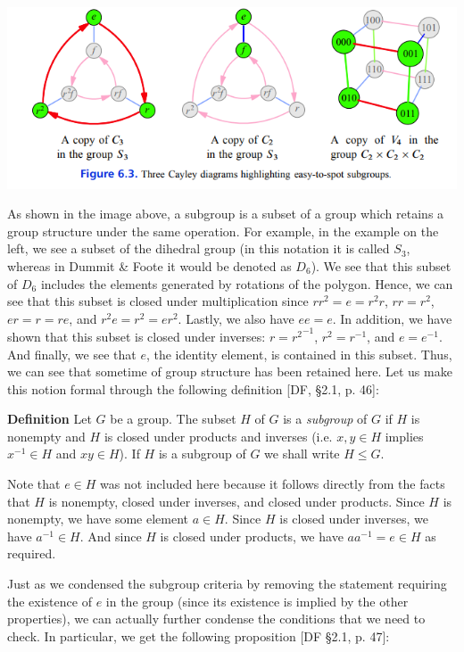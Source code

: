 \documentclass[11pt, reqno]{amsart}
\theoremstyle{plain}
\theoremstyle{definition}
\theoremstyle{example}
\begin{document}
\includegraphics[scale=1]{cayleysubgroup}

\par
As shown in the image above, a subgroup is a subset of a group which retains a group structure under the same operation. For example, in the example on the left, we see a subset of the dihedral group (in this notation it is called $S_3$, whereas in Dummit \& Foote it would be denoted as $D_6$). We see that this subset of $D_6$ includes the elements generated by rotations of the polygon. Hence, we can see that this subset is closed under multiplication since $rr^2 = e = r^2r$, $rr = r^2$, $er = r = re$, and $r^2e = r^2 = er^2$. Lastly, we also have $ee = e$. In addition, we have shown that this subset is closed under inverses: $r = {r^2}^{-1}$, $r^2 = r^{-1}$, and $e = e^{-1}$. And finally, we see that $e$, the identity element, is contained in this subset. Thus, we can see that sometime of group structure has been retained here. Let us make this notion formal through the following definition [DF, \S 2.1, p. 46]:

\par
\textbf{Definition} Let $G$ be a group. The subset $H$ of $G$ is a \textit{subgroup} of $G$ if $H$ is nonempty and $H$ is closed under products and inverses (i.e. $x, y \in H$ implies $x^{-1} \in H$ and $xy \in H$). If $H$ is a subgroup of $G$ we shall write $H \le G$.

\par
Note that $e \in H$ was not included here because it follows directly from the facts that $H$ is nonempty, closed under inverses, and closed under products. Since $H$ is nonempty, we have some element $a \in H$. Since $H$ is closed under inverses, we have $a^{-1} \in H$. And since $H$ is closed under products, we have $aa^{-1} = e \in H$ as required.

\par
Just as we condensed the subgroup criteria by removing the statement requiring the existence of $e$ in the group (since its existence is implied by the other properties), we can actually further condense the conditions that we need to check. In particular, we get the following proposition [DF \S 2.1, p. 47]:
\end{document}
